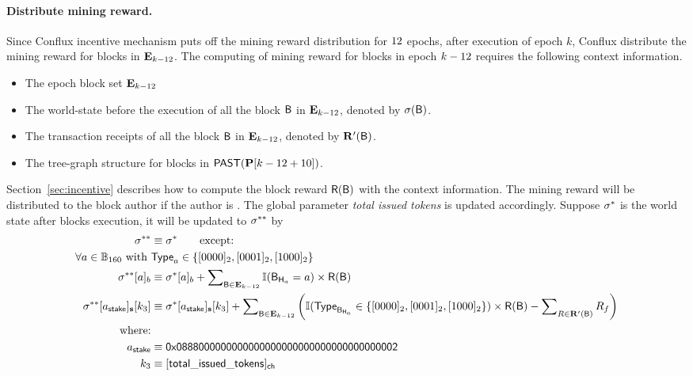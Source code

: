 \paragraph{Distribute mining reward. } Since Conflux incentive mechanism puts off the mining reward distribution for $12$ epochs, after execution of epoch $k$, Conflux distribute the mining reward for blocks in $\mathbf{E}_{k-12}$. The computing of mining reward for blocks in epoch $k-12$ requires the following context information.
\begin{itemize}[nosep]
	\item The epoch block set $\mathbf{E}_{k-12}$
	\item The world-state before the execution of all the block $\textsf{B}$ in $\mathbf{E}_{k-12}$, denoted by $\mathbf{\sigma}(\textsf{B})$.
	\item The transaction receipts of all the block $\textsf{B}$ in $\mathbf{E}_{k-12}$, denoted by $\mathbf{R}'(\textsf{B})$.
	\item The tree-graph structure for blocks in $\mathsf{PAST}(\mathbf{P}[k-12+{10}])$. 
\end{itemize}

Section~\ref{sec:incentive} describes how to compute the block reward $\textsf{R}(\textsf{B})$ with the context information. The mining reward will be distributed to the block author if the author is . The global parameter \emph{total issued tokens} is updated accordingly. Suppose $\mathbf{\sigma}^*$ is the world state after blocks execution, it will be updated to $\mathbf{\sigma}^{**}$ by
%
\begin{align}
	\st^{**}&\eqdef \st^* \qquad \mbox{except:} \\ 
	\forall a\in \B_{160} \mbox{ with }& \mathsf{Type}_a \in \{[0000]_2,[0001]_2,[1000]_2\} \\ 
	\st^{**}[a]_b&\eqdef \st^*[a]_b +\sum\nolimits_{\block \in \mathbf{E}_{k-\minerfreeze}} \mathbb{I}(\block_{\head_a}=a) \times \reward(\block) \\ 
	\st^{**}[a_{\sf stake}]_{\bf s}[k_3]&\eqdef \st^*[a_{\sf stake}]_{\bf s}[k_3] +\sum\nolimits_{\block \in \mathbf{E}_{k-\minerfreeze}} \left(\mathbb{I}(\mathsf{Type}_{\block_{\head_a}} \in \{[0000]_2,[0001]_2,[1000]_2\} ) \times \reward(\block)-\sum\nolimits_{R\in \mathbf{R}'(\block)}R_f\right) \\ 
	\mbox{where:}&  \\
	a_{\sf stake} &\eqdef \stakingcontract \\ 
	k_3  &\eqdef [{\sf total\char`_issued\char`_tokens}]_{\sf ch}
\end{align}

